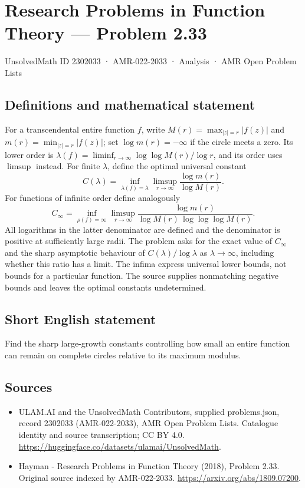 \documentclass[11pt,a4paper]{article}
\begin{document}
\section*{Research Problems in Function Theory — Problem 2.33}\label{2302033}
{\small UnsolvedMath ID 2302033 · AMR-022-2033 · Analysis · AMR Open Problem Lists}
\subsection{Definitions and mathematical statement}
For a transcendental entire function $f$, write
$M(r)=\max_{|z|=r}|f(z)|$ and $m(r)=\min_{|z|=r}|f(z)|$; set $\log m(r)=-\infty$ if the circle meets a zero.
Its lower order is $\lambda(f)=\liminf_{r\to\infty}\log\log M(r)/\log r$, and its order uses $\limsup$ instead. For finite $\lambda$, define the optimal universal constant
\[
C(\lambda)=\inf_{\lambda(f)=\lambda}
\limsup_{r\to\infty}\frac{\log m(r)}{\log M(r)}.
\]
For functions of infinite order define analogously
\[
C_\infty=\inf_{\rho(f)=\infty}
\limsup_{r\to\infty}
\frac{\log m(r)}{\log M(r)\,\log\log\log M(r)}.
\]
All logarithms in the latter denominator are defined and the denominator is positive at sufficiently large radii. The problem asks for the exact value of $C_\infty$ and the sharp asymptotic behaviour of $C(\lambda)/\log\lambda$ as $\lambda\to\infty$, including whether this ratio has a limit. The infima express universal lower bounds, not bounds for a particular function. The source supplies nonmatching negative bounds and leaves the optimal constants undetermined.
\subsection{Short English statement}
Find the sharp large-growth constants controlling how small an entire function can remain on complete circles relative to its maximum modulus.
\subsection{Sources}
\begin{itemize}
\item[S1] ULAM.AI and the UnsolvedMath Contributors, supplied problems.json, record 2302033 (AMR-022-2033), AMR Open Problem Lists. Catalogue identity and source transcription; CC BY 4.0.
\url{https://huggingface.co/datasets/ulamai/UnsolvedMath}.
\item[S2] Hayman - Research Problems in Function Theory (2018), Problem 2.33. Original source indexed by AMR-022-2033.
\url{https://arxiv.org/abs/1809.07200}.
\end{itemize}
\end{document}
